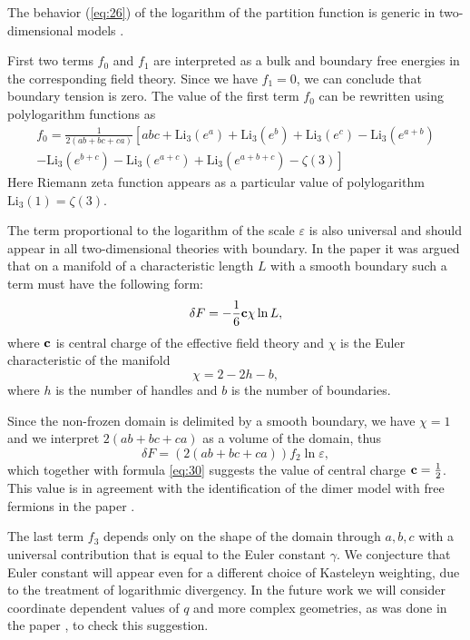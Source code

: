 \documentclass{article}
\newcommand{\Li}{\mathrm{Li}}
\begin{document}
The behavior (\ref{eq:26}) of the logarithm of the partition function is generic in two-dimensional
models \cite{cardy1988finite}.

First two terms $f_{0}$ and $f_{1}$ are interpreted as a bulk and
boundary free energies in the corresponding field theory. Since we have $f_{1}=0$, we can conclude
that boundary tension is zero.
The value of the first term $f_{0}$ can be rewritten using polylogarithm functions as
\begin{multline}
  \label{eq:34}
  f_{0}=\frac{1}{2(ab+bc+ca)}\left[abc + \Li_{3}(e^{a})+\Li_{3}(e^{b})+\Li_{3}(e^{c})-
    \Li_{3}(e^{a+b})\right.\\
  \left.-\Li_{3}(e^{b+c})-    \Li_{3}(e^{a+c})+    \Li_{3}(e^{a+b+c})-\zeta(3)\right]
\end{multline}
Here Riemann zeta function appears as a particular value of polylogarithm $\Li_{3}(1)=\zeta(3)$. 

The term proportional to the logarithm of the scale $\varepsilon$ is also universal
\cite{cardy1988finite} and should appear in all two-dimensional theories with boundary. In the paper
\cite{cardy1988finite} it was argued that on a manifold of a characteristic length $L$ with a smooth
boundary such a term must have the following form:
\begin{equation}
  \label{eq:31}
  \delta F = -\frac{1}{6}{\bf c} \chi \ln L,
\end{equation}
where ${\bf c}$ is central charge of the effective field theory and $\chi$ is the Euler characteristic of
the manifold
\begin{equation}
  \label{eq:32}
  \chi=2-2 h-b,
\end{equation}
where $h$ is the number of handles and $b$ is the number of boundaries. 

Since the non-frozen domain is delimited by a smooth boundary, we have $\chi=1$ and we interpret
$2(ab+bc+ca)$ as a volume of the domain, thus
\begin{equation}
  \label{eq:33}
  \delta F = \left(2(ab+bc+ca)\right) f_{2}\ln\varepsilon,
\end{equation}
which together with formula \eqref{eq:30} suggests the value of central charge
${\bf c}=\frac{1}{2}$. This value is in agreement with the identification of the dimer model with
free fermions in the paper \cite{dijkgraaf2009dimer}.

The last term $f_{3}$ depends only on the shape of the domain through $a,b,c$ with a universal
contribution that is equal to the Euler constant $\gamma$. We conjecture that Euler constant will
appear even for a different choice of Kasteleyn weighting, due to the treatment of logarithmic
divergency. In the future work we will consider coordinate dependent values of $q$ and more complex
geometries, as was done in the paper \cite{okounkov2007random}, to check this suggestion. 
\end{document}
